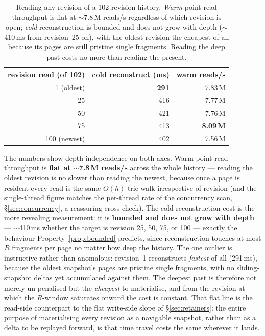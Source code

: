 \documentclass[11pt,a4paper,oneside]{report}
\theoremstyle{sirixthm}
\begin{document}
\begin{table}[h]
\centering\footnotesize\setlength{\tabcolsep}{8pt}\renewcommand{\arraystretch}{1.25}
\begin{tabular}{@{}r r r@{}}
\toprule
\textbf{revision read (of 102)} & \textbf{cold reconstruct (ms)} & \textbf{warm reads/s}\\
\midrule
1 (oldest)   & \textbf{291} & 7.83\,M\\
25           & 416 & 7.77\,M\\
50           & 421 & 7.76\,M\\
75           & 413 & \textbf{8.09\,M}\\
100 (newest) & 402 & 7.56\,M\\
\bottomrule
\end{tabular}
\caption{Reading any revision of a 102-revision history. \emph{Warm} point-read throughput is flat at
$\sim$7.8\,M reads/s regardless of which revision is open; \emph{cold} reconstruction is bounded and does
not grow with depth ($\sim$410\,ms from revision~25 on), with the oldest revision the cheapest of all
because its pages are still pristine single fragments. Reading the deep past costs no more than reading
the present.}
\label{tab:histreadparity}
\end{table}

The numbers show depth-independence on both axes. Warm point-read throughput is \textbf{flat at
$\sim$7.8\,M reads/s} across the whole history --- reading the oldest revision is no slower than reading
the newest, because once a page is resident every read is the same $O(h)$ trie walk irrespective of
revision (and the single-thread figure matches the per-thread rate of the concurrency scan,
\S\ref{sec:concurrency}, a reassuring cross-check). The cold reconstruction cost is the more revealing
measurement: it is \textbf{bounded and does not grow with depth} --- $\sim$410\,ms whether the target is
revision 25, 50, 75, or 100 --- exactly the behaviour Property~\ref{prop:bounded} predicts, since
reconstruction touches at most $R$ fragments per page no matter how deep the history. The one outlier is
instructive rather than anomalous: revision~1 reconstructs \emph{fastest} of all (291\,ms), because the
oldest snapshot's pages are pristine single fragments, with no sliding-snapshot deltas yet accumulated
against them. The deepest past is therefore not merely un-penalised but the \emph{cheapest} to
materialise, and from the revision at which the $R$-window saturates onward the cost is constant. That
flat line is the read-side counterpart to the flat write-side slope of \S\ref{sec:retainers}: the entire
purpose of materialising every revision as a navigable snapshot, rather than as a delta to be replayed
forward, is that time travel costs the same wherever it lands.
\end{document}
